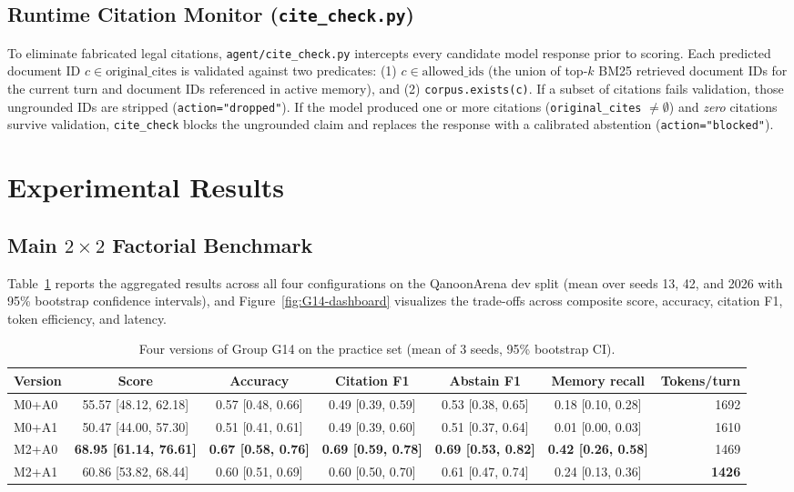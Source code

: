 \documentclass[11pt]{article}
\newcommand{\groupid}{G14}
\begin{document}
\subsection{Runtime Citation Monitor (\texttt{cite\_check.py})}
To eliminate fabricated legal citations, \texttt{agent/cite\_check.py} intercepts every candidate model response prior to scoring. Each predicted document ID $c \in \text{original\_cites}$ is validated against two predicates: (1) $c \in \text{allowed\_ids}$ (the union of top-$k$ BM25 retrieved document IDs for the current turn and document IDs referenced in active memory), and (2) \texttt{corpus.exists(c)}. If a subset of citations fails validation, those ungrounded IDs are stripped (\texttt{action="dropped"}). If the model produced one or more citations (\texttt{original\_cites} $\neq \emptyset$) and \emph{zero} citations survive validation, \texttt{cite\_check} blocks the ungrounded claim and replaces the response with a calibrated abstention (\texttt{action="blocked"}).

\section{Experimental Results}
\label{sec:\groupid-results}

\subsection{Main $2\times 2$ Factorial Benchmark}
Table~\ref{tab:\groupid-main} reports the aggregated results across all four configurations on the QanoonArena dev split (mean over seeds 13, 42, and 2026 with 95\% bootstrap confidence intervals), and Figure~\ref{fig:\groupid-dashboard} visualizes the trade-offs across composite score, accuracy, citation F1, token efficiency, and latency.

\begin{table}[h]
\centering\small
\caption{Four versions of Group \groupid{} on the practice set (mean of 3 seeds, 95\% bootstrap CI).}
\label{tab:\groupid-main}
\begin{tabular}{lcccccr}
\toprule
Version & Score & Accuracy & Citation F1 & Abstain F1 & Memory recall & Tokens/turn \\
\midrule
M0+A0 & 55.57 [48.12, 62.18] & 0.57 [0.48, 0.66] & 0.49 [0.39, 0.59] & 0.53 [0.38, 0.65] & 0.18 [0.10, 0.28] & 1692 \\
M0+A1 & 50.47 [44.00, 57.30] & 0.51 [0.41, 0.61] & 0.49 [0.39, 0.60] & 0.51 [0.37, 0.64] & 0.01 [0.00, 0.03] & 1610 \\
M2+A0 & \textbf{68.95 [61.14, 76.61]} & \textbf{0.67 [0.58, 0.76]} & \textbf{0.69 [0.59, 0.78]} & \textbf{0.69 [0.53, 0.82]} & \textbf{0.42 [0.26, 0.58]} & 1469 \\
M2+A1 & 60.86 [53.82, 68.44] & 0.60 [0.51, 0.69] & 0.60 [0.50, 0.70] & 0.61 [0.47, 0.74] & 0.24 [0.13, 0.36] & \textbf{1426} \\
\bottomrule
\end{tabular}
\end{table}
\end{document}
